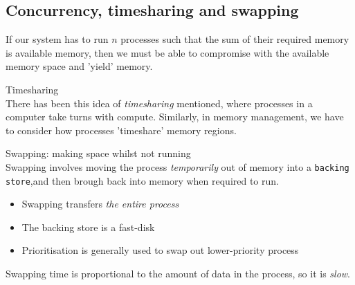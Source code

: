 \documentclass[journal, letterpaper]{IEEEtran}
\begin{document}
\subsection{Concurrency, timesharing and swapping}
If our system has to run $n$ processes such that the sum of their required memory is available memory, then we must be able to compromise with the available memory space and 'yield' memory.
\begin{aside}{Timesharing} \\
    There has been this idea of \textit{timesharing} mentioned, where processes in a computer take turns with compute. Similarly, in memory management, we have to consider how processes 'timeshare' memory regions.
\end{aside}
\begin{theory}{Swapping: making space whilst not running} \\
    Swapping involves moving the process \textit{temporarily} out of memory into a \verb|backing store|,and then brough back into memory when required to run.
    \begin{itemize}
        \item Swapping transfers \textit{the entire process}
        \item The backing store is a fast-disk
        \item Prioritisation is generally used to swap out lower-priority process
    \end{itemize}
    Swapping time is proportional to the amount of data in the process, so it is \textit{slow}.
\end{theory}
\end{document}
